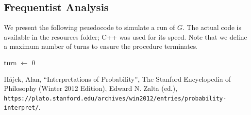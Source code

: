 \documentclass{article}
\theoremstyle{definition}
\theoremstyle{plain}
\begin{document}
	\subsection{Frequentist Analysis}
	We present the following psuedocode to simulate a run of $G$. The actual code is available in the resources folder; C++ was used for its speed. Note that we define a maximum number of turns to ensure the procedure terminates.
	\begin{algorithm}

	turn $\gets$ 0\\
	\end{algorithm}
	
	\begin{thebibliography}{9}
		H\'{a}jek, Alan, ``Interpretations of Probability'', The Stanford Encyclopedia of Philosophy (Winter 2012 Edition), Edward N. Zalta (ed.), \texttt{https://plato.stanford.edu/archives/win2012/entries/probability-interpret/}.
	\end{thebibliography}
\end{document}
